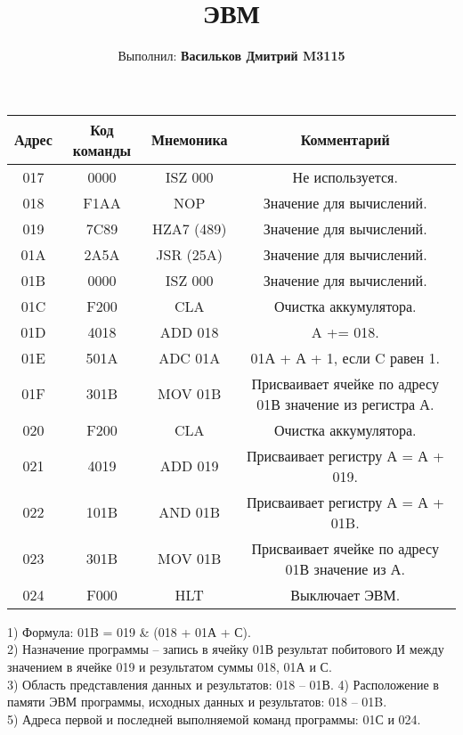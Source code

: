 \documentclass{article}
\title{ЭВМ}
\author{Выполнил: \textbf{Васильков Дмитрий M3115}}
\begin{document}
\maketitle
\begin{table}[h]
\centering
\begin{tabular}{|c|c|c|c|}
\hline
Адрес & Код команды & Мнемоника & Комментарий \\
\hline
017 & 0000 & ISZ 000& Не используется. \\
018 & F1AA & NOP & Значение для вычислений. \\
019 & 7C89 & HZA7 (489) & Значение для вычислений. \\
01A & 2A5A & JSR (25A) & Значение для вычислений. \\
01B & 0000 & ISZ 000 & Значение для вычислений. \\
01C & F200 & CLA & Очистка аккумулятора. \\
01D & 4018 & ADD 018 & A += 018. \\
01E & 501A & ADC 01A & 01А + А + 1, если C равен 1. \\
01F & 301B & MOV 01B& Присваивает ячейке по адресу 01В значение из регистра А. \\
020 & F200 & CLA & Очистка аккумулятора. \\
021 & 4019 & ADD  019 & Присваивает регистру А = А + 019. \\
022 & 101B & AND 01B & Присваивает регистру А = А + 01B. \\
023 & 301B & MOV 01B & Присваивает ячейке по адресу 01В значение из А. \\
024 & F000 & HLT & Выключает ЭВМ. \\
\hline
\end{tabular}
\end{table}

\begin{center}
    1) Формула: 01B = 019 & (018 + 01А + С).\\
2) Назначение программы – запись в ячейку 01В результат побитового И
между значением в ячейке 019 и результатом суммы 018, 01А и С.\\
3) Область представления данных и результатов: 018 – 01В. 4)
Расположение в памяти ЭВМ программы, исходных данных и
результатов: 018 – 01B.\\
5) Адреса первой и последней выполняемой команд программы: 01С и
024.
\end{center}
\end{document}
